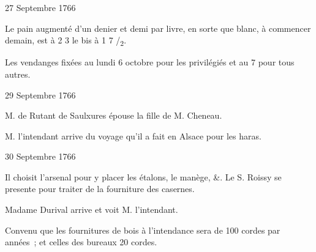                      \begin{diary}{27 Septembre 1766}{}
                        
                         Le pain augmenté d’un denier et demi
                           par livre, en sorte que blanc, à
                           commencer demain, est à 2 3 le bis
                           à 1 7
                           /\textsubscript{2}. \bigskip
        
        
                         Les vendanges fixées au lundi 6 octobre
                           pour les privilégiés et au 7 pour
                           tous autres. \bigskip
        
        
                     \end{diary}

                     \begin{diary}{29 Septembre 1766}{}
                        
                        
                           M. de Rutant de Saulxures épouse
                              la fille
                              de M. Cheneau.
                        \bigskip
        
        
                        
                           M. l’intendant arrive du voyage
                           qu’il a
                           fait en Alsace pour les haras.
                        \bigskip
        
        
                     \end{diary}

                     \begin{diary}{30 Septembre 1766}{}
                        
                         Il choisit l’arsenal pour y placer les étalons,
                           le manège, &. Le S. Roissy
                           se presente
                           pour traiter de la fourniture des
                              casernes. \bigskip
        
        
                        
                           Madame Durival arrive et voit M. l’intendant. \bigskip
        
        
                         Convenu que les fournitures de bois à
                              l’intendance
                           sera de 100 cordes par années ; et celles
                           des bureaux 20 cordes. \bigskip
        
        
                     \end{diary}
